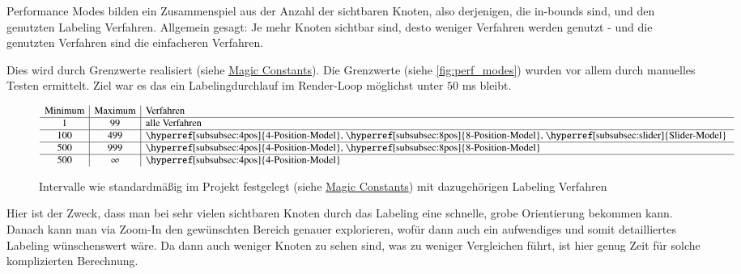 
Performance Modes bilden ein Zusammenspiel aus der Anzahl der sichtbaren Knoten, also derjenigen, die in-bounds sind, und den
genutzten Labeling Verfahren. Allgemein gesagt: Je mehr Knoten sichtbar sind, desto weniger Verfahren werden genutzt -
und die genutzten Verfahren sind die einfacheren Verfahren.

Dies wird durch Grenzwerte realisiert (siehe \hyperref[subsec:consts]{Magic Constants}).
Die Grenzwerte (siehe \autoref{fig:perf_modes}) wurden vor allem durch manuelles Testen ermittelt.
Ziel war es das ein Labelingdurchlauf im Render-Loop möglichst unter $50$ ms bleibt.

\begin{figure}[H]
    \centering
    $$
    \begin{array}{c|c|l}
        \text{Minimum} & \text{Maximum} & \text{Verfahren}\\ \hline
        1 & 99 & \text{alle Verfahren}\\ \hline
        100 & 499 & \text{\hyperref[subsubsec:4pos]{4-Position-Model}, \hyperref[subsubsec:8pos]{8-Position-Model}, \hyperref[subsubsec:slider]{Slider-Model} }\\ \hline
        500 & 999 & \text{\hyperref[subsubsec:4pos]{4-Position-Model}, \hyperref[subsubsec:8pos]{8-Position-Model} }\\ \hline
        500 & \infty & \text{\hyperref[subsubsec:4pos]{4-Position-Model}}
    \end{array}
    $$
    \caption{Intervalle wie standardmäßig im Projekt festgelegt (siehe \hyperref[subsec:consts]{Magic Constants}) mit dazugehörigen Labeling Verfahren}
    \label{fig:perf_modes}
\end{figure}

Hier ist der Zweck, dass man bei sehr vielen sichtbaren Knoten durch das Labeling eine schnelle, grobe Orientierung bekommen kann.
Danach kann man via Zoom-In den gewünschten Bereich genauer explorieren, wofür dann auch ein aufwendiges und somit detailliertes Labeling wünschenswert wäre.
Da dann auch weniger Knoten zu sehen sind, was zu weniger Vergleichen führt, ist hier genug Zeit für solche komplizierten Berechnung.
